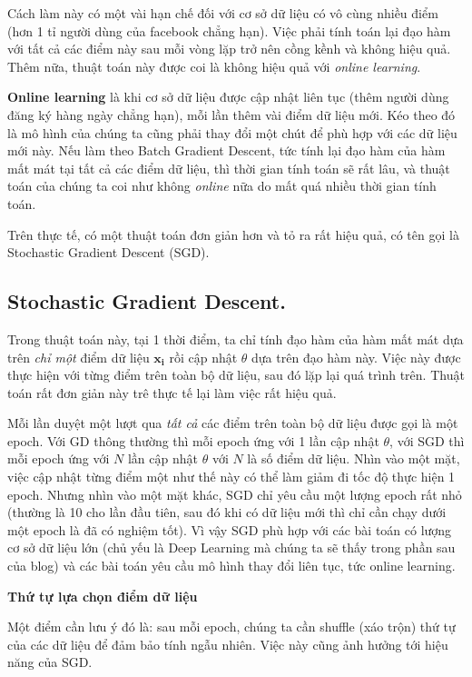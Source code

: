 Cách làm này có một vài hạn chế đối với cơ sở dữ liệu có vô cùng nhiều điểm (hơn 1 tỉ người dùng của facebook chẳng hạn). Việc phải tính toán lại đạo hàm với tất cả các điểm này sau mỗi vòng lặp trở nên cồng kềnh và không hiệu quả. Thêm nữa, thuật toán này được coi là không hiệu quả với \textit{online learning}. 
 
 
\textbf{Online learning} là khi cơ sở dữ liệu được cập nhật liên tục (thêm người dùng đăng ký hàng ngày chẳng hạn), mỗi lần thêm vài điểm dữ liệu mới. Kéo theo đó là mô hình của chúng ta cũng phải thay đổi một chút để phù hợp với các dữ liệu mới này. Nếu làm theo Batch Gradient Descent, tức tính lại đạo hàm của hàm mất mát tại tất cả các điểm dữ liệu, thì thời gian tính toán sẽ rất lâu, và thuật toán của chúng ta coi như không \textit{online} nữa do mất quá nhiều thời gian tính toán. 
 
Trên thực tế, có một thuật toán đơn giản hơn và tỏ ra rất hiệu quả, có tên gọi là Stochastic Gradient Descent (SGD). 
 
\subsection{Stochastic Gradient Descent.}
Trong thuật toán này, tại 1 thời điểm, ta chỉ tính đạo hàm của hàm mất mát dựa trên \textit{chỉ một} điểm dữ liệu $\mathbf{x_i}$ rồi cập nhật $\theta$ dựa trên đạo hàm này. Việc này được thực hiện với từng điểm trên toàn bộ dữ liệu, sau đó lặp lại quá trình trên. Thuật toán rất đơn giản này trê thực tế lại làm việc rất hiệu quả.  
 
Mỗi lần duyệt một lượt qua \textit{tất cả} các điểm trên toàn bộ dữ liệu được gọi là một epoch. Với GD thông thường thì mỗi epoch ứng với 1 lần cập nhật $\theta$, với SGD thì mỗi epoch ứng với $N$ lần cập nhật $\theta$ với $N$ là số điểm dữ liệu. Nhìn vào một mặt, việc cập nhật từng điểm một như thế này có thể làm giảm đi tốc độ thực hiện 1 epoch. Nhưng nhìn vào một mặt khác, SGD chỉ yêu cầu một lượng epoch rất nhỏ (thường là 10 cho lần đầu tiên, sau đó khi có dữ liệu mới thì chỉ cần chạy dưới một epoch là đã có nghiệm tốt). Vì vậy SGD phù hợp với các bài toán có lượng cơ sở dữ liệu lớn (chủ yếu là Deep Learning mà chúng ta sẽ thấy trong phần sau của blog) và các bài toán yêu cầu mô hình thay đổi liên tục, tức online learning. 
 
\textbf{Thứ tự lựa chọn điểm dữ liệu} 
 
Một điểm cần lưu ý đó là: sau mỗi epoch, chúng ta cần shuffle (xáo trộn) thứ tự của các dữ liệu để đảm bảo tính ngẫu nhiên. Việc này cũng ảnh hưởng tới hiệu năng của SGD.  
 
